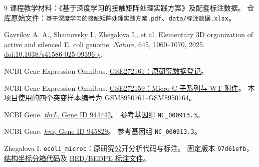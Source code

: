 \begin{thebibliography}{9}
课程教学材料：《基于深度学习的接触矩阵处理实践方案》及配套标注数据。
仓库原始文件：\texttt{基于深度学习的接触矩阵处理实践方案.pdf}、\texttt{data/标注数据.xlsx}。

Gavrilov A. A., Shamovsky I., Zhegalova I., et al.
Elementary 3D organization of active and silenced E. coli genome.
\textit{Nature}, 645, 1060--1070, 2025.
\href{https://doi.org/10.1038/s41586-025-09396-y}{doi:10.1038/s41586-025-09396-y}.

NCBI Gene Expression Omnibus.
\href{https://www.ncbi.nlm.nih.gov/geo/query/acc.cgi?acc=GSE272161}{GSE272161：原研究数据登记}。

NCBI Gene Expression Omnibus.
\href{https://www.ncbi.nlm.nih.gov/geo/query/acc.cgi?acc=GSE272159}{GSE272159：Micro-C 子系列与 WT 附件}。
本项目使用的四个突变样本编号为 GSM8950761--GSM8950764。

NCBI Gene. \href{https://www.ncbi.nlm.nih.gov/gene/944742}{\textit{thrL}, Gene ID 944742}。
参考基因组 \texttt{NC\_000913.3}。

NCBI Gene. \href{https://www.ncbi.nlm.nih.gov/gene/945829}{\textit{hns}, Gene ID 945829}。
参考基因组 \texttt{NC\_000913.3}。

Zhegalova I. \texttt{ecoli\_microc}：原研究公开分析代码与标注。
固定版本 \texttt{97d61efb}，
\href{https://github.com/irzhegalova/ecoli_microc/blob/97d61efb980599c93deba6d3c1b651bc2bd4bb60/scripts/pins.py#L35-L58}{结构坐标分箱代码}及
\href{https://github.com/irzhegalova/ecoli_microc/tree/97d61efb980599c93deba6d3c1b651bc2bd4bb60/data}{BED/BEDPE 标注文件}。
\end{thebibliography}
